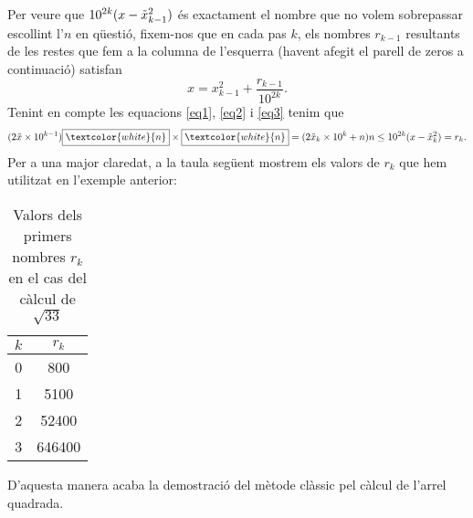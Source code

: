 \documentclass[11pt,a4paper]{article}
\theoremstyle{definition}
\renewcommand{\arraystretch}{1.75}
\begin{document}
Per veure que $10^{2k}(x-\Tilde{x}_{k-1}^2)$ és exactament el nombre que no volem sobrepassar escollint l'$n$ en qüestió, fixem-nos que en cada pas $k$, els nombres $r_{k-1}$ resultants de les restes que fem a la columna de l'esquerra (havent afegit el parell de zeros a continuació) satisfan
\begin{equation}
    x=x_{k-1}^2+\frac{r_{k-1}}{10^{2k}}.
    \label{eq3}
\end{equation}Tenint en compte les equacions \eqref{eq1}, \eqref{eq2} i \eqref{eq3} tenim que
\begin{equation*}
    (2\Tilde{x}\times10^{k-1})\boxed{\textcolor{white}{n}}\times\boxed{\textcolor{white}{n}}=(2\Tilde{x}_k\times10^k+n)n\leq 10^{2k}(x-\Tilde{x}_k^2)=r_k.
\end{equation*}
Per a una major claredat, a la taula següent mostrem els valors de $r_k$ que hem utilitzat en l'exemple anterior:\par
\begin{table}[ht]
    \centering
    \renewcommand\arraystretch{1.3}
    \begin{tabular}{c|c}
        $k$ & $r_k$  \\
        \hline\hline
        0   & 800    \\
        1   & 5100   \\
        2   & 52400  \\
        3   & 646400
    \end{tabular}
    \caption{Valors dels primers nombres $r_k$ en el cas del càlcul de $\sqrt{33}$}
    \label{tab:my_label}
\end{table}
D'aquesta manera acaba la demostració del mètode clàssic pel càlcul de l'arrel quadrada.
\cite{1}
\end{document}
